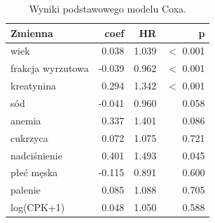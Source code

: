 \begin{table}[htbp]
\centering
\caption{Wyniki podstawowego modelu Coxa.}
\label{tab:cox}
\scriptsize
\setlength{\tabcolsep}{1.5pt}
\begin{tabular}{lrrr}
\toprule
Zmienna & coef & HR & p \\
\midrule
wiek & 0.038 & 1.039 & $<$ 0.001 \\
frakcja wyrzutowa & -0.039 & 0.962 & $<$ 0.001 \\
kreatynina & 0.294 & 1.342 & $<$ 0.001 \\
sód & -0.041 & 0.960 & 0.058 \\
anemia & 0.337 & 1.401 & 0.086 \\
cukrzyca & 0.072 & 1.075 & 0.721 \\
nadciśnienie & 0.401 & 1.493 & 0.045 \\
płeć męska & -0.115 & 0.891 & 0.600 \\
palenie & 0.085 & 1.088 & 0.705 \\
log(CPK+1) & 0.048 & 1.050 & 0.588 \\
\bottomrule
\end{tabular}
\end{table}
